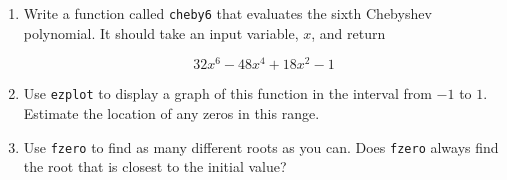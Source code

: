 \begin{ex}

\begin{enumerate}


\item Write a function called \lstinline{cheby6} that evaluates the
sixth Chebyshev polynomial.  It should take an input variable,
$x$, and return

\begin{equation*}
32 x^6 - 48 x^4 + 18 x^2 - 1
\end{equation*}

\item Use \lstinline{ezplot} to display a graph of this function in the
interval from $-1$ to $1$.  Estimate the location of any zeros in this
range.

\item Use \lstinline{fzero} to find as many different roots as you can.
Does \lstinline{fzero} always find the root that is closest to the initial
value?

\end{enumerate}

\end{ex}


